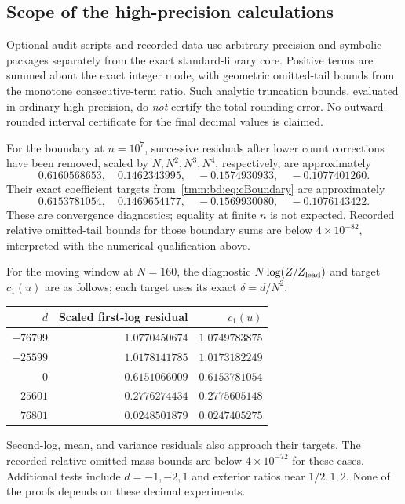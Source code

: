 \documentclass[11pt,letterpaper]{article}
\theoremstyle{remark}\newtheorem{remark}[theorem]{Remark}
\begin{document}
\subsection{Scope of the high-precision calculations}
Optional audit scripts and recorded data use arbitrary-precision and symbolic packages separately from the exact standard-library core. Positive terms are summed about the exact integer mode, with geometric omitted-tail bounds from the monotone consecutive-term ratio. Such analytic truncation bounds, evaluated in ordinary high precision, do \emph{not} certify the total rounding error. No outward-rounded interval certificate for the final decimal values is claimed.

For the boundary at $n=10^7$, successive residuals after lower count corrections have been removed, scaled by $N,N^2,N^3,N^4$, respectively, are approximately
\[
 0.6160568653,\quad0.1462343995,\quad-0.1574930933,\quad-0.1077401260.
\]
Their exact coefficient targets from~\eqref{tmm:bd:eq:cBoundary} are approximately
\[
 0.6153781054,\quad0.1469654177,\quad-0.1569930080,\quad-0.1076143422.
\]
These are convergence diagnostics; equality at finite $n$ is not expected. Recorded relative omitted-tail bounds for those boundary sums are below $4\times10^{-82}$, interpreted with the numerical qualification above.

For the moving window at $N=160$, the diagnostic $N\log(Z/Z_{\rm lead})$ and target $c_1(u)$ are as follows; each target uses its exact $\delta=d/N^2$.
\begin{center}
\begin{tabular}{rrr}
\toprule
$d$ & Scaled first-log residual & $c_1(u)$\\
\midrule
$-76799$ & $1.0770450674$ & $1.0749783875$\\
$-25599$ & $1.0178141785$ & $1.0173182249$\\
$0$ & $0.6151066009$ & $0.6153781054$\\
$25601$ & $0.2776274434$ & $0.2775605148$\\
$76801$ & $0.0248501879$ & $0.0247405275$\\
\bottomrule
\end{tabular}
\end{center}
Second-log, mean, and variance residuals also approach their targets. The recorded relative omitted-mass bounds are below $4\times10^{-72}$ for these cases. Additional tests include $d=-1,-2,1$ and exterior ratios near $1/2,1,2$. None of the proofs depends on these decimal experiments.
\end{document}
